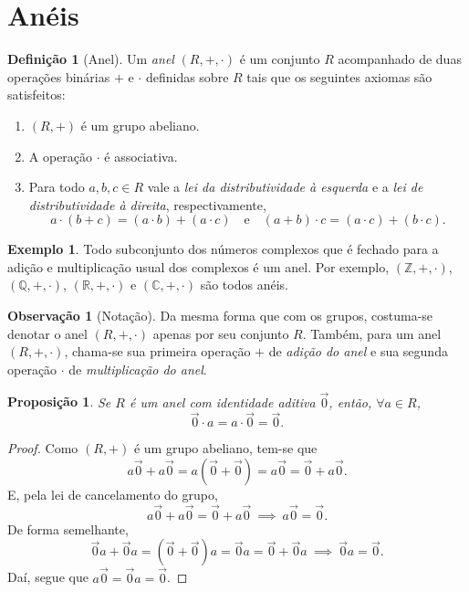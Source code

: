 \documentclass[a4paper,12pt]{article}
\theoremstyle{plain}
\newtheorem{proposicao}{Proposição}[section]
\theoremstyle{definition}
\newtheorem{definicao}{Definição}[section]
\newtheorem{observacao}{Observação}[section]
\newtheorem{exemplo}{Exemplo}[section]
\begin{document}
	\section{Anéis}
	
	\begin{definicao}[Anel]
		Um \emph{anel} $(R, +, \cdot)$ é um conjunto $R$ acompanhado de duas operações binárias $+$ e $\cdot$ definidas sobre $R$ tais que os seguintes axiomas são satisfeitos:
		\begin{enumerate}
			\item $(R, +)$ é um grupo abeliano.
			\item A operação $\cdot$ é associativa.
			\item Para todo $a,b,c\in R$ vale a \emph{lei da distributividade à esquerda} e a \emph{lei de distributividade à direita}, respectivamente, $$a\cdot(b+c) = (a\cdot b) + (a\cdot c)\quad \text{e} \quad (a+b)\cdot c = (a\cdot c) + (b\cdot c).$$
		\end{enumerate}
	\end{definicao}
	
	\begin{exemplo}
		Todo subconjunto dos números complexos que é fechado para a adição e multiplicação usual dos complexos é um anel. Por exemplo, $(\mathbb{Z}, +, \cdot)$, $(\mathbb{Q}, +, \cdot)$, $(\mathbb{R}, +, \cdot)$ e $(\mathbb{C}, +, \cdot)$ são todos anéis.
	\end{exemplo}
	
	\begin{observacao}[Notação]
		 Da mesma forma que com os grupos, costuma-se denotar o anel $(R, +, \cdot)$ apenas por seu conjunto $R$. Também, para um anel $(R, +, \cdot)$, chama-se sua primeira operação $+$ de \emph{adição do anel} e sua segunda operação $\cdot$ de \emph{multiplicação do anel}. 
	\end{observacao}

	\begin{proposicao}
		Se $R$ é um anel com identidade aditiva $\vec 0$, então, $\forall a \in R$, $$\vec 0 \cdot a = a \cdot \vec 0 = \vec 0.$$
	\end{proposicao}
	\begin{proof}
		Como $(R, +)$ é um grupo abeliano, tem-se que $$a\vec 0 + a\vec 0 = a(\vec 0 + \vec 0) = a\vec 0 = \vec 0 + a\vec 0.$$ E, pela lei de cancelamento do grupo, $$a\vec0 + a\vec 0 = \vec 0 + a\vec 0 \ \implies \ a\vec 0 = \vec 0.$$
		De forma semelhante, $$\vec 0a + \vec 0a = (\vec 0 + \vec 0)a = \vec 0a = \vec 0 + \vec 0a \ \implies \ \vec 0a = \vec 0.$$ Daí, segue que $a\vec 0 = \vec 0a = \vec 0$. 
	\end{proof}
\end{document}
